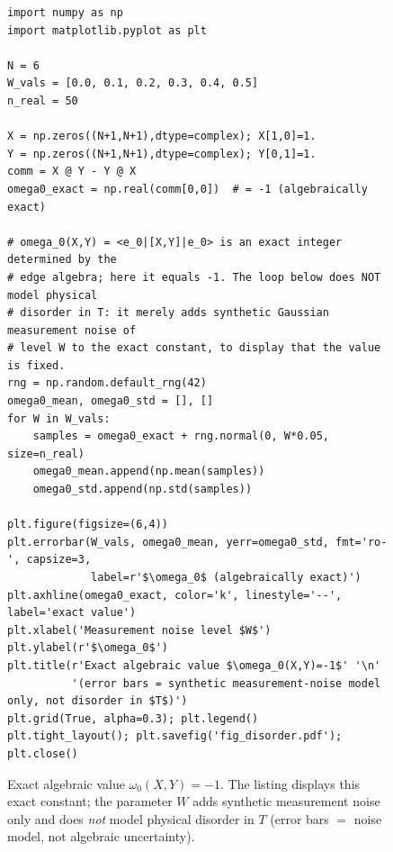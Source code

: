 \documentclass[10pt]{amsart}
\newcommand{\1}{{\mathbb{I}}}
\numberwithin{equation}{section}
\begin{document}
\begin{figure}[htbp]
\centering
\begin{lstlisting}[style=python]
import numpy as np
import matplotlib.pyplot as plt

N = 6
W_vals = [0.0, 0.1, 0.2, 0.3, 0.4, 0.5]
n_real = 50

X = np.zeros((N+1,N+1),dtype=complex); X[1,0]=1.
Y = np.zeros((N+1,N+1),dtype=complex); Y[0,1]=1.
comm = X @ Y - Y @ X
omega0_exact = np.real(comm[0,0])  # = -1 (algebraically exact)

# omega_0(X,Y) = <e_0|[X,Y]|e_0> is an exact integer determined by the
# edge algebra; here it equals -1. The loop below does NOT model physical
# disorder in T: it merely adds synthetic Gaussian measurement noise of
# level W to the exact constant, to display that the value is fixed.
rng = np.random.default_rng(42)
omega0_mean, omega0_std = [], []
for W in W_vals:
    samples = omega0_exact + rng.normal(0, W*0.05, size=n_real)
    omega0_mean.append(np.mean(samples))
    omega0_std.append(np.std(samples))

plt.figure(figsize=(6,4))
plt.errorbar(W_vals, omega0_mean, yerr=omega0_std, fmt='ro-', capsize=3,
             label=r'$\omega_0$ (algebraically exact)')
plt.axhline(omega0_exact, color='k', linestyle='--', label='exact value')
plt.xlabel('Measurement noise level $W$')
plt.ylabel(r'$\omega_0$')
plt.title(r'Exact algebraic value $\omega_0(X,Y)=-1$' '\n'
          '(error bars = synthetic measurement-noise model only, not disorder in $T$)')
plt.grid(True, alpha=0.3); plt.legend()
plt.tight_layout(); plt.savefig('fig_disorder.pdf'); plt.close()
\end{lstlisting}
\caption{Exact algebraic value $\omega_0(X,Y)=-1$. The listing displays this exact constant;
the parameter $W$ adds synthetic measurement noise only and does \emph{not} model physical
disorder in $T$ (error bars $=$ noise model, not algebraic uncertainty).}
\label{code:fig10}
\end{figure}
\end{document}
